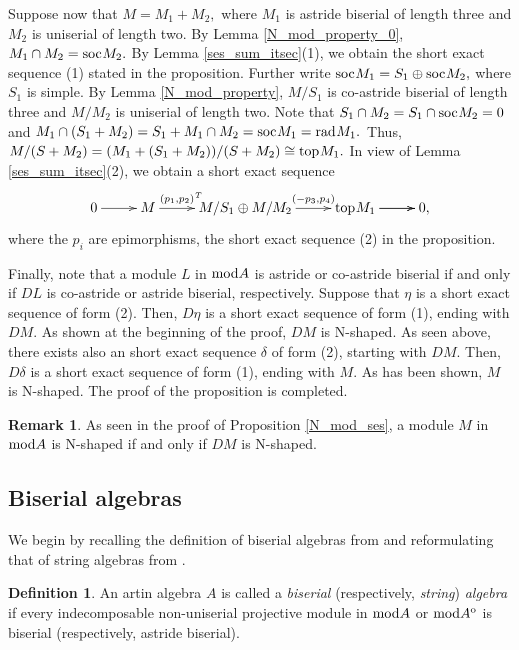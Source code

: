 \documentclass[10pt]{amsart}
\theoremstyle{definition}
\newtheorem{Defn}[Theo]{Definition}
\newtheorem{Remark}[Theo]{Remark}
\newcommand{\mmod}{{\rm mod}}
\newcommand{\rad}{{\rm rad}\hspace{.5pt}}
\newcommand{\soc}{{\rm soc}\hspace{.5pt}}
\newcommand{\ntop}{{\rm top}\hspace{.5pt}}
\newcommand{\hp}{\hspace{.5pt}}
\begin{document}
Suppose now that $M=M_1+M_2,$ where $M_1$ is astride biserial of length three and $M_2$ is uniserial of length two. By Lemma \ref{N_mod_property_0}, $M_1\cap M_2=\soc M_2.$ By Lemma \ref{ses_sum_itsec}(1), we obtain the short exact sequence (1) stated in the proposition. Further write $\soc M_1=S_1\oplus \soc M_2,$ where $S_1$ is simple. By Lemma \ref{N_mod_property}, $M/S_1$ is co-astride biserial of length three and $M/M_2$ is uniserial of length two. Note that  $S_1\cap M_2=S_1\cap \soc M_2=0$ and $M_1\cap (S_1+M_2)=S_1+M_1\cap M_2=\soc M_1=\rad M_1.$ Thus, $M/(S+M_2)=(M_1+(S_1+M_2))/(S+M_2)\cong \ntop M_1.$ In view of Lemma \ref{ses_sum_itsec}(2), we obtain a short exact sequence \vspace{-7pt}
$$\xymatrixcolsep{25pt}\xymatrix{0\ar[r] & M \ar[r]^-{\hspace{6pt} (p_1, p_2)^{\hp T}} & M/S_1\oplus M/M_2\ar[r]^-{(-p_3, p_4)} & \ntop M_1\ar[r] \ar[r] & 0,}\vspace{-6pt}$$ where the $p_i$ are epimorphisms, the short exact sequence (2) in the proposition.

Finally, note that a module $L$ in $\mmod A$ is astride or co-astride biserial if and only if $DL$ is co-astride or astride biserial, respectively. Suppose that $\eta$ is a short exact sequence of form (2). Then, $D\eta$ is a short exact sequence of form (1), ending with $DM$. As shown at the beginning of the proof, $DM$ is N-shaped. As seen above, there exists also an short exact sequence $\delta$ of form (2), starting with $DM$. Then, $D\delta$ is a short exact sequence of form (1), ending with $M$. As has been shown, $M$ is N-shaped. The proof of the proposition is completed. 

\begin{Remark}\label{N_mod_dual} As seen in the proof of Proposition \ref{N_mod_ses}, a module $M$ in $\mmod A$ is N-shaped if and only if $DM$ is N-shaped. \end{Remark}

\subsection{\sc Biserial algebras} We begin by recalling the definition of biserial algebras from \cite{Ful} and reformulating that of string algebras from \cite{LiY}. 

\begin{Defn}\label{bsa_def} An artin algebra $A$ is called a {\it biserial} (respectively, {\it string}) {\it algebra} if every indecomposable non-uniserial projective module in $\mmod A$ or $\mmod A^{\rm o}$ is biserial (respectively, astride biserial).
    
\end{Defn}
\end{document}
